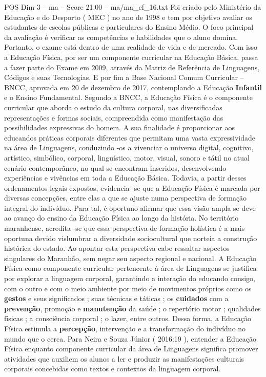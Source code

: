 \begin{textsample}{POS Dim 3 – ma – Score 21.00 – ma/ma\_ef\_16.txt}
Foi criado pelo Ministério da Educação e do Desporto ( MEC ) no ano de 1998 e tem por objetivo avaliar os estudantes de escolas públicas e particulares do Ensino Médio.
O foco principal da avaliação é verificar as competências e habilidades que o aluno domina.
Portanto, o exame está dentro de uma realidade de vida e de mercado.
Com isso a Educação Física, por ser um componente curricular na Educação Básica, passa a fazer parte do Exame em 2009, através da Matriz de Referência de Linguagens, Códigos e suas Tecnologias.
E por fim a Base Nacional Comum Curricular – BNCC, aprovada em 20 de dezembro de 2017, contemplando a Educação \textbf{Infantil} e o Ensino Fundamental.
Segundo a BNCC, a Educação Física é o componente curricular que aborda o estudo da cultura corporal, nas diversificadas representações e formas sociais, compreendida como manifestação das possibilidades expressivas do homem.
A sua finalidade é proporcionar aos educandos práticas corporais diferentes que permitam uma vasta expressividade na área de Linguagens, conduzindo -os a vivenciar o universo digital, cognitivo, artístico, simbólico, corporal, linguístico, motor, visual, sonoro e tátil no atual cenário contemporâneo, no qual se encontram inseridos, desenvolvendo experiências e vivências em toda a Educação Básica.
Todavia, a partir desses ordenamentos legais expostos, evidencia -se que a Educação Física é marcada por diversas concepções, entre elas a que se ajuste numa perspectiva de formação integral do indivíduo.
Para tal, é oportuno afirmar que essa visão ampla se deve ao avanço do ensino da Educação Física ao longo da história.
No território maranhense, acredita -se que essa perspectiva de formação holística é a mais oportuna devido vislumbrar a diversidade sociocultural que norteia a construção histórica do estado.
Ao apontar esta perspectiva cabe ressaltar aspectos singulares do Maranhão, sem negar seu aspecto regional e nacional.
A Educação Física como componente curricular pertencente à área de Linguagens se justifica por explorar a linguagem corporal, garantindo a interação do educando consigo, com o outro e com o meio ambiente por meio de movimentos próprios como os \textbf{gestos} e seus significados ; suas técnicas e táticas ; os \textbf{cuidados} com a \textbf{prevenção}, promoção e \textbf{manutenção} da saúde ; o repertório motor ; qualidades físicas ; a consciência corporal ; o lazer, entre outros.
Dessa forma, a Educação Física estimula a \textbf{percepção}, intervenção e a transformação do indivíduo no mundo que o cerca.
Para Neira e Souza Júnior ( 2016:19 ), entender a Educação Física enquanto componente curricular da área de Linguagens significa promover atividades que auxiliem os alunos a ler e produzir as manifestações culturais corporais concebidas como textos e contextos da linguagem corporal.

\end{textsample}
